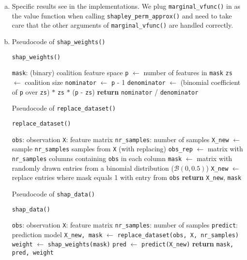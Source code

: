 {\begin{enumerate}[a)]
    \item Specific results see in the implementations. We plug \texttt{marginal\_vfunc()} in as the value function when calling \texttt{shapley\_perm\_approx()} and need to take care that the other arguments of \texttt{marginal\_vfunc()} are handled correctly.

	\item Pseudocode of \texttt{shap\_weights()}
	
	\begin{algorithm}[H]
		\caption{\texttt{shap\_weights()}}
		\begin{algorithmic}[1]
			\Require \texttt{mask}: (binary) coalition feature space
			\State \texttt{p} $\gets$ number of features in \texttt{mask}
			\State \texttt{zs} $\gets$ coalition size 
			\State \texttt{nominator} $\gets$ \texttt{p} - 1
			\State \texttt{denominator} $\gets$ (binomial coefficient of \texttt{p} over \texttt{zs}) $*$ \texttt{zs} $*$ (\texttt{p} - \texttt{zs})
			\State \textbf{return} \texttt{nominator} / \texttt{denominator}
		\end{algorithmic}
	\end{algorithm}

    \newpage

	Pseudocode of \texttt{replace\_dataset()}
	
	\begin{algorithm}[H]
		\caption{\texttt{replace\_dataset()}}
		\begin{algorithmic}[1]
			\Require \texttt{obs}: observation
			\Require \texttt{X}: feature matrix
			\Require \texttt{nr\_samples}: number of samples
			\State \texttt{X\_new} $\gets$ sample \texttt{nr\_samples} samples from \texttt{X} (with replacing)
			\State \texttt{obs\_rep} $\gets$ matrix with \texttt{nr\_samples} columns containing \texttt{obs} in each column
			\State \texttt{mask} $\gets$ matrix with randomly drawn entries from a binomial distribution ($\mathcal{B}(0, 0.5)$)
			\State \texttt{X\_new} $\gets$ replace entries where mask equals 1 with entry from \texttt{obs}
			\State \textbf{return} \texttt{X\_new}, \texttt{mask}
		\end{algorithmic}
	\end{algorithm}

	Pseudocode of \texttt{shap\_data()}
	
	\begin{algorithm}[H]
		\caption{\texttt{shap\_data()}}
		\begin{algorithmic}[1]
			\Require \texttt{obs}: observation
			\Require \texttt{X}: feature matrix
			\Require \texttt{nr\_samples}: number of samples
			\Require \texttt{predict}: prediction model
			\State \texttt{X\_new, mask} $\gets$ \texttt{replace\_dataset(obs, X, nr\_samples)}
			\State \texttt{weight} $\gets$ \texttt{shap\_weights(mask)}
			\State \texttt{pred} $\gets$ \texttt{predict(X\_new)}
			\State \textbf{return} \texttt{mask, pred, weight}
		\end{algorithmic}
	\end{algorithm}


\end{enumerate}}
